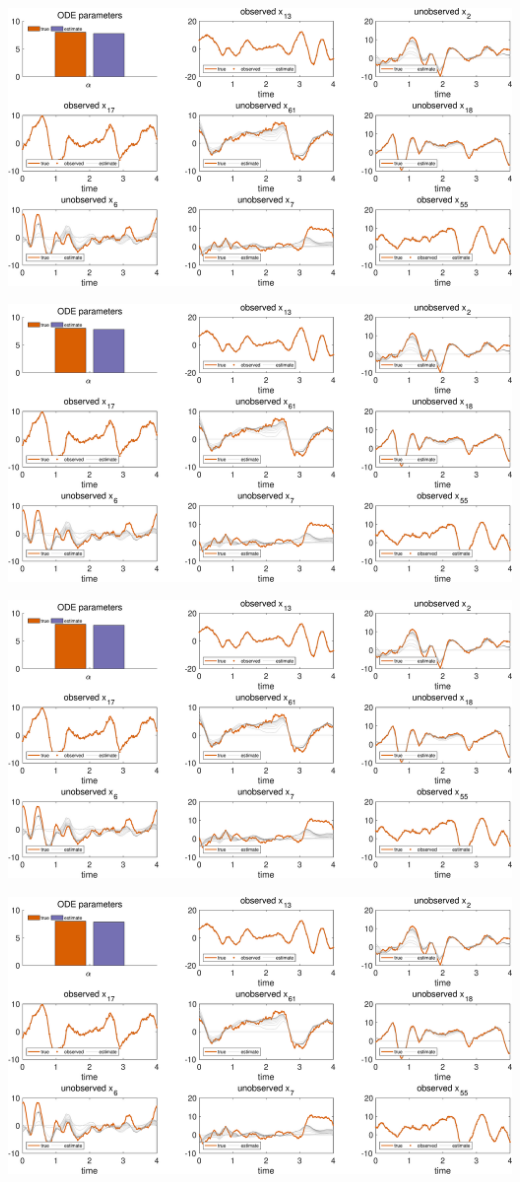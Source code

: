 {\includegraphics [width=5.5in]{VGM_for_Lorenz96_14.eps}

\includegraphics [width=5.5in]{VGM_for_Lorenz96_15.eps}

\includegraphics [width=5.5in]{VGM_for_Lorenz96_16.eps}

\includegraphics [width=5.5in]{VGM_for_Lorenz96_17.eps}

}
